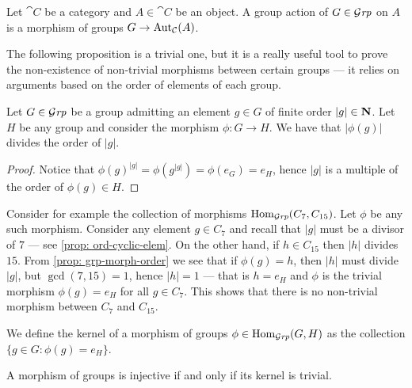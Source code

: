 \begin{definition}\label{def: grp-action}
  Let \(\cat C\) be a category and \(A \in \cat C\) be an object. A group action
  of \(G \in {\mathcal{G}\textit{rp}}\) on \(A\) is a morphism of groups \(G \to \operatorname{Aut}_{\mathcal{C}}
  (A)\).
\end{definition}

The following proposition is a trivial one, but it is a really useful tool to
prove the non-existence of non-trivial morphisms between certain groups --- it
relies on arguments based on the order of elements of each group.

\begin{proposition}\label{prop: grp-morph-order}
  Let \(G \in {\mathcal{G}\textit{rp}}\) be a group admitting an element \(g \in G\) of finite order
  \(|g| \in \mathbf{N}\). Let \(H\) be any group and consider the morphism \(\phi: G \to
  H\). We have that \(|\phi(g)|\) divides the order of \(|g|\).
\end{proposition}

\begin{proof}
  Notice that \({\phi(g)}^{|g|} = \phi(g^{|g|}) = \phi(e_G) = e_H\), hence \(|g|\)
  is a multiple of the order of \(\phi(g) \in H\).
\end{proof}

\begin{example}
  Consider for example the collection of morphisms \(\operatorname{Hom}_{\mathcal{G}\textit{rp}}(C_7, C_{15})\).
  Let \(\phi\) be any such morphism. Consider any element \(g \in C_7\) and
  recall that \(|g|\) must be a divisor of \(7\) --- see \cref{prop:
  ord-cyclic-elem}. On the other hand, if \(h \in C_{15}\) then \(|h|\) divides
  \(15\). From \cref{prop: grp-morph-order} we see that if \(\phi(g) = h\), then
  \(|h|\) must divide \(|g|\), but \(\gcd(7, 15) = 1\), hence
  \(|h| = 1\) --- that is \(h = e_H\) and \(\phi\) is the trivial morphism
  \(\phi(g) = e_H\) for all \(g \in C_7\). This shows that there is no
  non-trivial morphism between \(C_7\) and \(C_{15}\).
\end{example}

\begin{definition}[Kernel]
  We define the kernel of a morphism of groups \(\phi \in \operatorname{Hom}_{\mathcal{G}\textit{rp}}(G, H)\) as
  the collection \(\{g \in G: \phi(g) = e_H\}\).
\end{definition}

\begin{proposition}\label{prop: ker-trivial-inj}
  A morphism of groups is injective if and only if its kernel is trivial.
\end{proposition}

